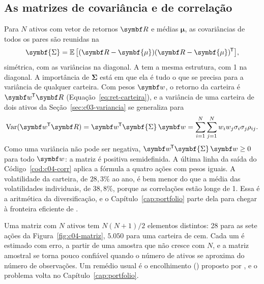 \subsection{As matrizes de covariância e de correlação}

Para $N$ ativos com vetor de retornos $\vetor{R}$ e médias $\symbf{\mu}$, as covariâncias de todos os pares são reunidas na 
\begin{equation}
  \symbf{\Sigma} = \E\big[(\vetor{R}-\symbf{\mu})(\vetor{R}-\symbf{\mu})\T\big] ,
  \label{eq:c04-sigma}
\end{equation}
simétrica, com as variâncias na diagonal. A  tem a mesma estrutura, com 1 na diagonal. A importância de $\symbf{\Sigma}$ está em que ela é tudo o que se precisa para a variância de qualquer carteira. Com pesos $\vetor{w}$, o retorno da carteira é $\vetor{w}\T\vetor{R}$ (Equação~\eqref{eq:ret-carteira}), e a variância de uma carteira de dois ativos da Seção~\ref{sec:c03-variancia} se generaliza para
\begin{equation}
  \Var(\vetor{w}\T\vetor{R}) = \vetor{w}\T\symbf{\Sigma}\,\vetor{w} = \sum_{i=1}^{N}\sum_{j=1}^{N} w_i w_j \sigma_i \sigma_j \rho_{ij} .
  \label{eq:c04-var-cart}
\end{equation}
Como uma variância não pode ser negativa, $\vetor{w}\T\symbf{\Sigma}\,\vetor{w} \ge 0$ para todo $\vetor{w}$: a matriz é positiva semidefinida. A última linha da saída do Código~\ref{cod:c04-corr} aplica a fórmula a quatro ações com pesos iguais. A volatilidade da carteira, de $28,3\%$ ao ano, é bem menor do que a média das volatilidades individuais, de $38,8\%$, porque as correlações estão longe de 1. Essa é a aritmética da diversificação, e o Capítulo~\ref{cap:portfolio} parte dela para chegar à fronteira eficiente de \citet{markowitz1952}.


Uma matriz com $N$ ativos tem $N(N+1)/2$ elementos distintos: 28 para as sete ações da Figura~\ref{fig:c04-matriz}, $5.050$ para uma carteira de cem. Cada um é estimado com erro, a partir de uma amostra que não cresce com $N$, e a matriz amostral se torna pouco confiável quando o número de ativos se aproxima do número de observações. Um remédio usual é o encolhimento () proposto por \citet{ledoit2004}, e o problema volta no Capítulo~\ref{cap:portfolio}.

